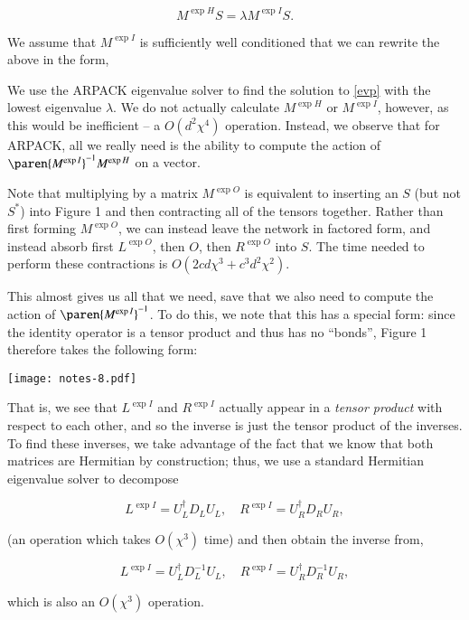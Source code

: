 \documentclass[12pt]{amsart}
\begin{document}
    $$M^{\exp{H}} S = \lambda M^{\exp{I}} S.$$

We assume that $M^{\exp{I}}$ is sufficiently well conditioned that we can rewrite the above in the form,


\noindent We use the ARPACK eigenvalue solver to find the solution to \eqref{evp} with the lowest eigenvalue $\lambda$.  We do not actually calculate $M^{\exp{H}}$ or $M^{\exp{I}}$, however, as this would be inefficient -- a $O(d^2\chi^4)$ operation.  Instead, we observe that for ARPACK, all we really need is the ability to compute the action of $\paren{M^{\exp{I}}}^{-1} M^{\exp{H}}$ on a vector.

Note that multiplying by a matrix $M^{\exp{O}}$ is equivalent to inserting an $S$ (but not $S^*$) into Figure 1 and then contracting all of the tensors together.  Rather than first forming $M^{\exp{O}}$, we can instead leave the network in factored form, and instead absorb first $L^{\exp{O}}$, then $O$, then $R^{\exp{O}}$ into $S$.  The time needed to perform these contractions is $O(2cd\chi^3 + c^3d^2\chi^2)$.

This almost gives us all that we need, save that we also need to compute the action of $\paren{M^{\exp{I}}}^{-1}$.  To do this, we note that this has a special form:  since the identity operator is a tensor product and thus has no ``bonds'', Figure 1 therefore takes the following form:

    \begin{center}\texttt{[image: notes-8.pdf]}\end{center}

That is, we see that $L^{\exp{I}}$ and $R^{\exp{I}}$ actually appear in a \emph{tensor product} with respect to each other, and so the inverse is just the tensor product of the inverses.  To find these inverses, we take advantage of the fact that we know that both matrices are Hermitian by construction;  thus, we use a standard Hermitian eigenvalue solver to decompose

    $$L^{\exp{I}} = U_L^\dagger D_L U_L, \quad R^{\exp{I}} = U_R^\dagger D_R U_R,$$

\noindent (an operation which takes $O(\chi^3)$ time) and then obtain the inverse from,

    $$L^{\exp{I}} = U_L^\dagger D_L^{-1} U_L, \quad R^{\exp{I}} = U_R^\dagger D_R^{-1} U_R,$$

\noindent which is also an $O(\chi^3)$ operation.
\end{document}
